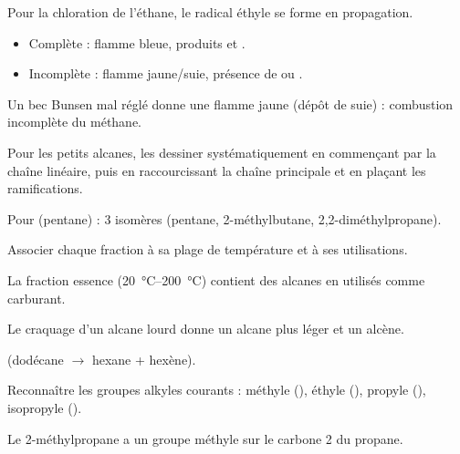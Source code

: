 \begin{exemple}
Pour la chloration de l'éthane, le radical éthyle  se forme en propagation.
\end{exemple}

\begin{itemize}
    \item Complète : flamme bleue, produits  et .
    \item Incomplète : flamme jaune/suie, présence de  ou .
\end{itemize}

\begin{exemple}
Un bec Bunsen mal réglé donne une flamme jaune (dépôt de suie) : combustion incomplète du méthane.
\end{exemple}

Pour les petits alcanes, les dessiner systématiquement en commençant par la chaîne linéaire, puis en raccourcissant la chaîne principale et en plaçant les ramifications.

\begin{exemple}
Pour  (pentane) : 3 isomères (pentane, 2-méthylbutane, 2,2-diméthylpropane).
\end{exemple}

Associer chaque fraction à sa plage de température et à ses utilisations.

\begin{exemple}
La fraction essence (\SIrange{20}{200}{\celsius}) contient des alcanes en  utilisés comme carburant.
\end{exemple}

Le craquage d'un alcane lourd donne un alcane plus léger et un alcène.

\begin{exemple}
 (dodécane $\rightarrow$ hexane + hexène).
\end{exemple}

Reconnaître les groupes alkyles courants : méthyle (), éthyle (), propyle (), isopropyle ().

\begin{exemple}
Le 2-méthylpropane a un groupe méthyle sur le carbone 2 du propane.
\end{exemple}